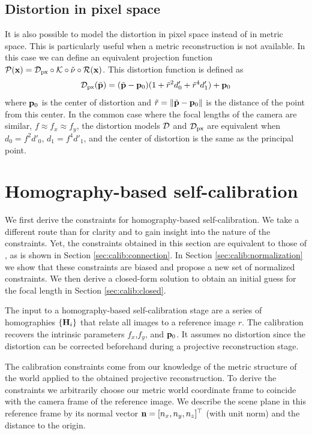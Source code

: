 \documentclass[10pt,twocolumn,letterpaper]{article}
\begin{document}
\subsection{Distortion in pixel space}

It is also possible to model the distortion in pixel space instead of in metric space. This is particularly useful when a metric reconstruction is not available. In this case we can define an equivalent projection function $\mathcal{P}(\mathbf{x}) = \mathcal{D}_{\text{px}} \circ \mathcal{K} \circ \check{\nu} \circ \mathcal{R}(\mathbf{x})$. This distortion function is defined as
%
\begin{align}
\mathcal{D}_{\text{px}}(\tilde{\mathbf{p}}) = (\tilde{\mathbf{p}} - \mathbf{p}_0)(1+\tilde{r}^2 d'_0 + \tilde{r}^4 d'_1) + \mathbf{p}_0
\label{eq:distortion_pixels}
\end{align}
%
where $\mathbf{p}_0$ is the center of distortion and $\tilde{r}=\lVert\tilde{\mathbf{p}}-\mathbf{p}_0\rVert$ is the distance of the point from this center. In the common case where the focal lengths of the camera are similar, \ie $f \approx f_x \approx f_y$, the distortion models $\mathcal{D}$ and $\mathcal{D}_{\text{px}}$ are equivalent when $d_0 = f^2 d'_0$, $d_1=f^4 d'_1$, and the center of distortion is the same as the principal point.

\section{Homography-based self-calibration}
We first derive the constraints for homography-based self-calibration. We take a different route than \cite{bocquillon2006} for clarity and to gain insight into the nature of the constraints. Yet, the constraints obtained in this section are equivalent to those of \cite{bocquillon2006}, as is shown in Section \ref{sec:calib:connection}. In Section \ref{sec:calib:normalization} we show that these constraints are biased and propose a new set of normalized constraints. We then derive a closed-form solution to obtain an initial guess for the focal length in Section \ref{sec:calib:closed}.

The input to a homography-based self-calibration stage are a series of homographies $\lbrace \mathbf{H}_i \rbrace$ that relate all images to a reference image $r$. The calibration recovers the intrinsic parameters $f_x$,$f_y$, and $\mathbf{p}_0$. It assumes no distortion since the distortion can be corrected beforehand during a projective reconstruction stage.

The calibration constraints come from our knowledge of the metric structure of the world applied to the obtained projective reconstruction. To derive the constraints we arbitrarily choose our metric world coordinate frame to coincide with the camera frame of the reference image. We describe the scene plane in this reference frame by its normal vector $\mathbf{n}=[n_x,n_y,n_z]^\top$ (with unit norm) and the distance to the origin.
\end{document}
